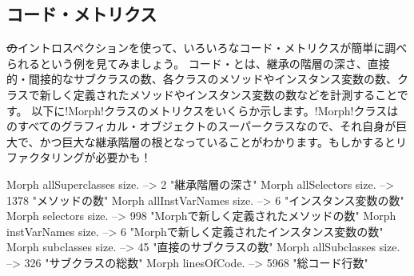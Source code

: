 \documentclass[a4paper,10pt,twoside]{book}
\begin{document}


\subsection{コード・メトリクス}

\st のイントロスペクションを使って、いろいろなコード・メトリクスが簡単に調べられるという例を見てみましょう。
コード・とは、継承の階層の深さ、直接的・間接的なサブクラスの数、各クラスのメソッドやインスタンス変数の数、クラスで新しく定義されたメソッドやインスタンス変数の数などを計測することです。
以下に\ct!Morph!クラスのメトリクスをいくらか示します。\ct!Morph!クラスは\pharo のすべてのグラフィカル・オブジェクトのスーパークラスなので、それ自身が巨大で、かつ巨大な継承階層の根となっていることがわかります。もしかするとリファクタリングが必要かも！

\begin{code}{}
Morph allSuperclasses size.  -->       2 "継承階層の深さ"
Morph allSelectors size.        --> 1378 "メソッドの数"
Morph allInstVarNames size. -->      6 "インスタンス変数の数"
Morph selectors size.             -->  998 "Morphで新しく定義されたメソッドの数"
Morph instVarNames size.     -->      6 "Morphで新しく定義されたインスタンス変数の数"
Morph subclasses size.          -->    45 "直接のサブクラスの数"
Morph allSubclasses size.      -->  326 "サブクラスの総数"
Morph linesOfCode.               --> 5968 "総コード行数"
\end{code}
\end{document}

